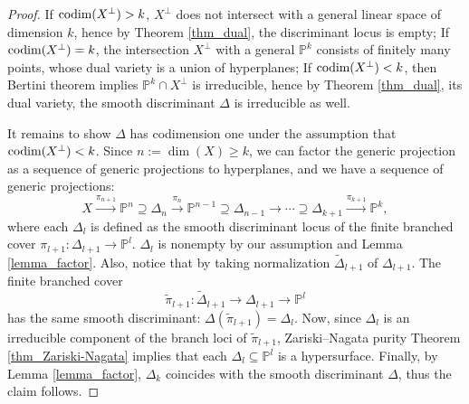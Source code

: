 \documentclass[12pt]{amsart}
\begin{document}
\begin{proof}
    If $\textup{codim}(X^{\perp})>k$, $X^{\perp}$ does not intersect with a general linear space of dimension $k$, hence by Theorem \ref{thm_dual}, the discriminant locus is empty; If $\textup{codim}(X^{\perp})=k$, the intersection $X^{\perp}$ with a general $\mathbb P^k$ consists of finitely many points, whose dual variety is a union of hyperplanes; If $\textup{codim}(X^{\perp})<k$, then Bertini theorem implies $\mathbb P^k\cap X^{\perp}$ is irreducible, hence by Theorem \ref{thm_dual}, its dual variety, the smooth discriminant $\Delta$ is irreducible as well.  %
    
    
    It remains to show $\Delta$ has codimension one under the assumption that $\textup{codim}(X^{\perp})<k$. Since $n:=\dim(X)\ge k$, we can factor the generic projection as a sequence of generic projections to hyperplanes, and we have a sequence of generic projections:
    $$X\xrightarrow{\pi_{n+1}} \mathbb P^{n}\supseteq \Delta_n\xrightarrow{\pi_n} \mathbb P^{n-1}\supseteq \Delta_{n-1}\to \cdots \supseteq \Delta_{k+1}\xrightarrow{\pi_{k+1}} \mathbb P^k,$$
    where each $\Delta_l$ is defined as the smooth discriminant locus of the finite branched cover $\pi_{l+1}:\Delta_{l+1}\to \mathbb P^l$. $\Delta_l$ is nonempty by our assumption and Lemma \ref{lemma_factor}.  Also, notice that by taking normalization $\tilde{\Delta}_{l+1}$ of $\Delta_{l+1}$. The finite branched cover 
    $$\tilde{\pi}_{l+1}:\tilde{\Delta}_{l+1}\to \Delta_{l+1}\to \mathbb P^{l}$$
    has the same smooth discriminant: $\Delta(\tilde{\pi}_{l+1})=\Delta_l$. Now, since $\Delta_l$ is an irreducible component of the branch loci of $\tilde{\pi}_{l+1}$,  Zariski--Nagata purity Theorem \ref{thm_Zariski-Nagata} implies that each $\Delta_l\subseteq \mathbb P^l$ is a hypersurface. Finally, by Lemma \ref{lemma_factor}, $\Delta_k$ coincides with the smooth discriminant $\Delta$, thus the claim follows.
\end{proof}
\end{document}
